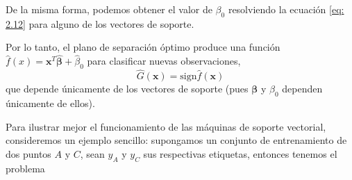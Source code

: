 \documentclass[letterpaper,12pt,oneside]{book}
\begin{document}
{{{De la misma forma, podemos obtener el valor de \( \beta_0 \) resolviendo la ecuación \eqref{eq: 2.12} para alguno de los vectores de soporte.

Por lo tanto, el plano de separación óptimo produce una función \( \hat{f}(x) = \mathbf{x}^T \hat{\boldsymbol{\beta}} + \hat{\beta}_0 \) para clasificar nuevas observaciones,
$$ \hat{G}(\mathbf{x}) = \text{sign} \hat{f}(\mathbf{x}) $$ 
que depende únicamente de los vectores de soporte (pues \( \boldsymbol{\beta} \) y \( \beta_0 \) dependen únicamente de ellos).

Para ilustrar mejor el funcionamiento de las máquinas de soporte vectorial, consideremos un ejemplo sencillo: supongamos un conjunto de entrenamiento de dos puntos \( A \) y \( C \), sean \( y_A \) y \( y_C \) sus respectivas etiquetas, entonces tenemos el problema
    
}}}
\end{document}
